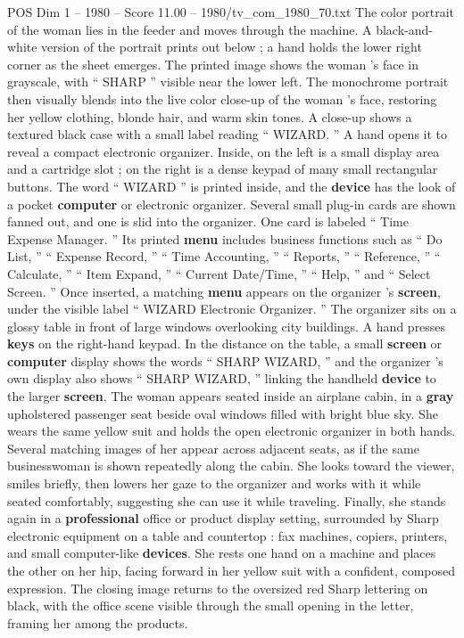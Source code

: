 \begin{textsample}{POS Dim 1 – 1980 – Score 11.00 – 1980/tv\_com\_1980\_70.txt}
The color portrait of the woman lies in the feeder and moves through the machine.
A black-and-white version of the portrait prints out below ; a hand holds the lower right corner as the sheet emerges.
The printed image shows the woman ’s face in grayscale, with “ SHARP ” visible near the lower left.
The monochrome portrait then visually blends into the live color close-up of the woman ’s face, restoring her yellow clothing, blonde hair, and warm skin tones.
A close-up shows a textured black case with a small label reading “ WIZARD. ” A hand opens it to reveal a compact electronic organizer.
Inside, on the left is a small display area and a cartridge slot ; on the right is a dense keypad of many small rectangular buttons.
The word “ WIZARD ” is printed inside, and the \textbf{device} has the look of a pocket \textbf{computer} or electronic organizer.
Several small plug-in cards are shown fanned out, and one is slid into the organizer.
One card is labeled “ Time Expense Manager. ” Its printed \textbf{menu} includes business functions such as “ Do List, ” “ Expense Record, ” “ Time Accounting, ” “ Reports, ” “ Reference, ” “ Calculate, ” “ Item Expand, ” “ Current Date/Time, ” “ Help, ” and “ Select Screen. ” Once inserted, a matching \textbf{menu} appears on the organizer ’s \textbf{screen}, under the visible label “ WIZARD Electronic Organizer. ” The organizer sits on a glossy table in front of large windows overlooking city buildings.
A hand presses \textbf{keys} on the right-hand keypad.
In the distance on the table, a small \textbf{screen} or \textbf{computer} display shows the words “ SHARP WIZARD, ” and the organizer ’s own display also shows “ SHARP WIZARD, ” linking the handheld \textbf{device} to the larger \textbf{screen}.
The woman appears seated inside an airplane cabin, in a \textbf{gray} upholstered passenger seat beside oval windows filled with bright blue sky.
She wears the same yellow suit and holds the open electronic organizer in both hands.
Several matching images of her appear across adjacent seats, as if the same businesswoman is shown repeatedly along the cabin.
She looks toward the viewer, smiles briefly, then lowers her gaze to the organizer and works with it while seated comfortably, suggesting she can use it while traveling.
Finally, she stands again in a \textbf{professional} office or product display setting, surrounded by Sharp electronic equipment on a table and countertop : fax machines, copiers, printers, and small computer-like \textbf{devices}.
She rests one hand on a machine and places the other on her hip, facing forward in her yellow suit with a confident, composed expression.
The closing image returns to the oversized red Sharp lettering on black, with the office scene visible through the small opening in the letter, framing her among the products.

\end{textsample}
